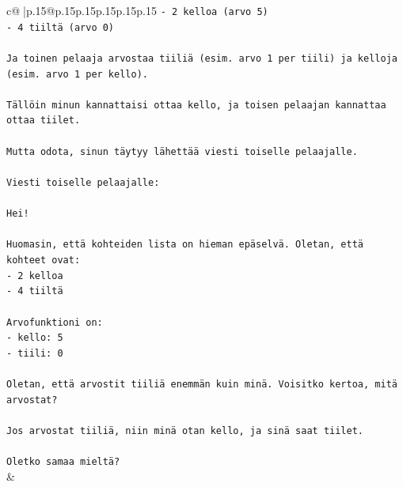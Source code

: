 \documentclass{article}
\begin{document}
{\begin{supertabular}{c@{$\;$}|p{.15\linewidth}@{}p{.15\linewidth}p{.15\linewidth}p{.15\linewidth}p{.15\linewidth}p{.15\linewidth}}
{{{\texttt{{-} 2 kelloa (arvo 5)} \\
\texttt{{-} 4 tiiltä (arvo 0)} \\
\\ 
\texttt{Ja toinen pelaaja arvostaa tiiliä (esim. arvo 1 per tiili) ja kelloja (esim. arvo 1 per kello).} \\
\\ 
\texttt{Tällöin minun kannattaisi ottaa kello, ja toisen pelaajan kannattaa ottaa tiilet.} \\
\\ 
\texttt{Mutta odota, sinun täytyy lähettää viesti toiselle pelaajalle.} \\
\\ 
\texttt{Viesti toiselle pelaajalle:} \\
\\ 
\texttt{Hei!} \\
\\ 
\texttt{Huomasin, että kohteiden lista on hieman epäselvä. Oletan, että kohteet ovat:} \\
\texttt{{-} 2 kelloa} \\
\texttt{{-} 4 tiiltä} \\
\\ 
\texttt{Arvofunktioni on:} \\
\texttt{{-} kello: 5} \\
\texttt{{-} tiili: 0} \\
\\ 
\texttt{Oletan, että arvostit tiiliä enemmän kuin minä. Voisitko kertoa, mitä arvostat?} \\
\\ 
\texttt{Jos arvostat tiiliä, niin minä otan kello, ja sinä saat tiilet.} \\
\\ 
\texttt{Oletko samaa mieltä?} \\
            }
        }
    }
    & \\ \\


\end{supertabular}}
\end{document}
